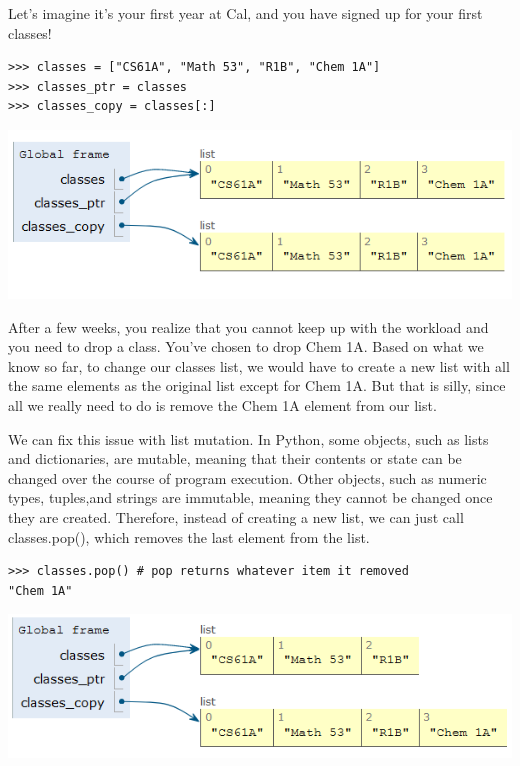 Let’s imagine it’s your first year at Cal, and you have signed up for your first classes!
\begin{lstlisting}
>>> classes = ["CS61A", "Math 53", "R1B", "Chem 1A"]
>>> classes_ptr = classes
>>> classes_copy = classes[:]
\end{lstlisting}

\begin{center}
\includegraphics[scale=0.75]{pointers.PNG}
\end{center}
After a few weeks, you realize that you cannot keep up with the workload and you need to drop a class. You’ve chosen to drop Chem 1A. Based on what we know so far, to change our classes list, we would have to create a new list with all the same elements as the original list except for Chem 1A. But that is silly, since all we really need to do is remove the Chem 1A element from our list.

We can fix this issue with list mutation. In Python, some objects, such as lists and dictionaries, are mutable, meaning that their contents or state can be changed over the course of program execution. Other objects, such as numeric types, tuples,and strings are immutable, meaning they cannot be changed once they are created. Therefore, instead of creating a new list, we can just call classes.pop(), which removes the last element from the list.
\newpage
\begin{lstlisting}
>>> classes.pop() # pop returns whatever item it removed
"Chem 1A"
\end{lstlisting}

\begin{center}
\includegraphics[scale=0.75]{pointers_mutate.PNG}
\end{center}

